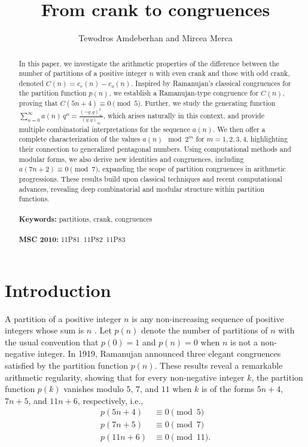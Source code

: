 \documentclass{article}
\title{From crank to congruences}
\author{Tewodros Amdeberhan and Mircea Merca}
\date{}
\begin{document}
\maketitle

\begin{abstract}  In this paper, we investigate the arithmetic properties of the difference between the number of partitions of a positive integer $n$ with even crank and those with odd crank, denoted $C(n) = c_e(n) - c_o(n)$. Inspired by Ramanujan’s classical congruences for the partition function $p(n)$, we establish a Ramanujan-type congruence %
 for $C(n)$, proving that $C(5n+4) \equiv 0 \pmod{5}$. Further, we study the generating function $\sum_{n=0}^\infty a(n)\, q^n = \frac{(-q; q)^2_\infty}{(q; q)_\infty}$, which arises naturally in this context, and provide multiple combinatorial interpretations for the sequence $a(n)$. We then offer a complete characterization of the values $a(n) \mod 2^m$ for $m = 1, 2, 3, 4$, highlighting their connection to generalized pentagonal numbers. Using computational methods and modular forms, we also derive new identities and congruences, including $a(7n+2) \equiv 0 \pmod{7}$, expanding the scope of partition congruences in arithmetic progressions. These results build upon classical techniques and recent computational advances, revealing deep combinatorial and modular structure within partition functions.
\\ 
\\
{\bf Keywords:}  partitions, crank, congruences
\\
\\
{\bf MSC 2010:}   11P81\, 11P82\, 11P83
\end{abstract}



\section{Introduction}


A partition of a positive integer $n$ is any non-increasing sequence of positive
integers whose sum is $n$ \cite{Andrews98}. Let $p(n)$ denote the number of partitions of $n$ with the usual convention that
$p(0)=1$ and $p(n)=0$ when $n$ is not a non-negative integer. 
In 1919, Ramanujan \cite{Ramanujan} announced three elegant congruences satisfied by the partition function $p(n)$. These results reveal a remarkable arithmetic regularity, showing that for every non-negative integer $k$, the partition function $p(k)$ vanishes modulo $5$, $7$, and $11$ when $k$ is of the forms $5n + 4$, $7n + 5$, and $11n + 6$, respectively, i.e.,
\begin{align*}
p(5n+4) &\equiv 0 \pmod 5\\
p(7n+5) &\equiv 0 \pmod 7\\
p(11n+6) &\equiv 0 \pmod {11}.
\end{align*}
\end{document}
